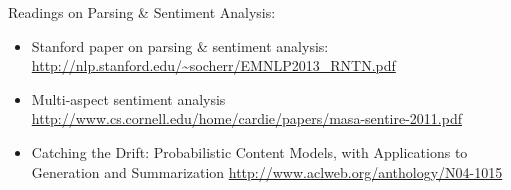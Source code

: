 \documentclass{article}
\begin{document}
Readings on Parsing \& Sentiment Analysis:
\begin{itemize}
\item Stanford paper on parsing \& sentiment analysis:
\newline
\url{http://nlp.stanford.edu/~socherr/EMNLP2013_RNTN.pdf}

\item Multi-aspect sentiment analysis
\newline 
\url{http://www.cs.cornell.edu/home/cardie/papers/masa-sentire-2011.pdf}

\item Catching the Drift: Probabilistic Content Models, with Applications to
Generation and Summarization \newline
\url{http://www.aclweb.org/anthology/N04-1015}
\end{itemize}
\end{document}
